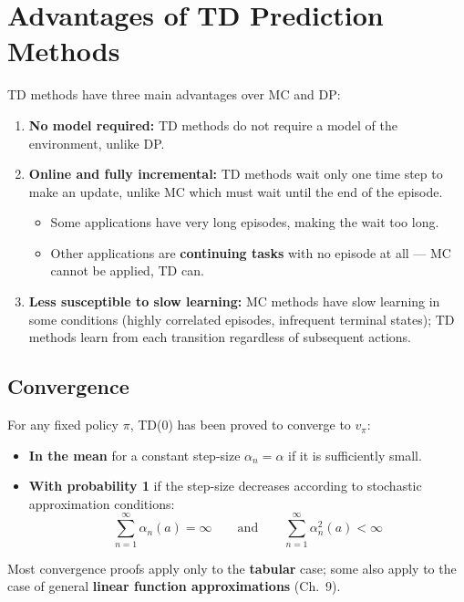\documentclass[11pt,a4paper]{article}
\theoremstyle{definition}
\theoremstyle{plain}
\theoremstyle{remark}
\begin{document}
\section{Advantages of TD Prediction Methods}

TD methods have three main advantages over MC and DP:

\begin{enumerate}
    \item \textbf{No model required:} TD methods do not require a model of the environment, unlike DP.
    \item \textbf{Online and fully incremental:} TD methods wait only one time step to make an update, unlike MC which must wait until the end of the episode.
        \begin{itemize}
            \item Some applications have very long episodes, making the wait too long.
            \item Other applications are \textbf{continuing tasks} with no episode at all — MC cannot be applied, TD can.
        \end{itemize}
    \item \textbf{Less susceptible to slow learning:} MC methods have slow learning in some conditions (highly correlated episodes, infrequent terminal states); TD methods learn from each transition regardless of subsequent actions.
\end{enumerate}

\subsection{Convergence}

For any fixed policy $\pi$, TD(0) has been proved to converge to $v_\pi$:
\begin{itemize}
    \item \textbf{In the mean} for a constant step-size $\alpha_n = \alpha$ if it is sufficiently small.
    \item \textbf{With probability 1} if the step-size decreases according to stochastic approximation conditions:
    \[
        \sum_{n=1}^\infty \alpha_n(a) = \infty \qquad \text{and} \qquad \sum_{n=1}^\infty \alpha_n^2(a) < \infty
    \]
\end{itemize}
Most convergence proofs apply only to the \textbf{tabular} case; some also apply to the case of general \textbf{linear function approximations} (Ch.\ 9).
\end{document}
